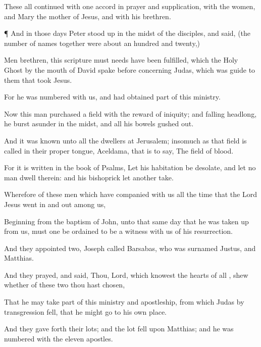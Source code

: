 {These
all
continued with one
accord in
prayer
and
supplication,
with the
women,
and
Mary the
mother of
Jesus,
and
with
his
brethren.


\par }{\PP {}¶
And
in
those
days
Peter stood
up
in the
midst of the
disciples,
and
said, (the
number of
names
together
were
about an
hundred and
twenty,)

Men
{}
brethren,
this
scripture must
needs have been
fulfilled,
which
the
Holy
Ghost
by the
mouth of
David spake
before
concerning
Judas, which
was
guide to them that
took
Jesus.

For
he
was
numbered
with
us,
and had
obtained
part of
this
ministry.

Now this
man
purchased a
field
with the
reward of
iniquity;
and
falling
headlong, he burst
asunder in the
midst,
and
all
his
bowels gushed
out.

And it
was
known unto
all the
dwellers at
Jerusalem; insomuch
as
that
field is
called in
their
proper
tongue,
Aceldama,
that is to
say, The
field of
blood.

For it is
written
in the
book of
Psalms,
Let
his
habitation
be
desolate,
and
let
no man
dwell
therein:
and
his
bishoprick
let
another
take.

Wherefore of these
men
which have
companied with
us
all the
time
that the
Lord
Jesus went
in
and
out
among
us,

Beginning
from the
baptism of
John,
unto that
same
day
that he was taken
up
from
us,
must
one be ordained to
be a
witness
with
us of
his
resurrection.

And they
appointed
two,
Joseph
called
Barsabas,
who was
surnamed
Justus,
and
Matthias.

And they
prayed,
and
said,
Thou,
Lord, which knowest the
hearts of
all
{},
shew
whether
of
these
two thou hast
chosen,

That he may
take
part of
this
ministry
and
apostleship,
from
which
Judas by
transgression fell, that he might
go
to his
own
place.

And they gave
forth
their
lots;
and the
lot
fell
upon
Matthias;
and he was
numbered
with the
eleven
apostles.




\par }
